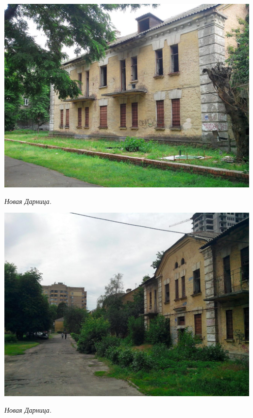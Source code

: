 \begin{center}
\includegraphics[width=\linewidth]{lpix/IMG_20160613_143848.jpg}

\textit{Новая Дарница.}
\end{center}

\begin{center}
\includegraphics[width=\linewidth]{lpix/IMG_20160613_143926.jpg}

\textit{Новая Дарница.}
\end{center}
\newpage

